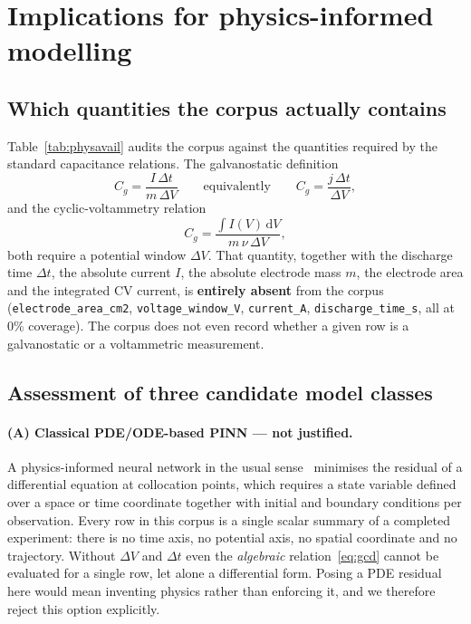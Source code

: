 \section{Implications for physics-informed modelling}\label{sec:pinn}

\subsection{Which quantities the corpus actually contains}
Table~\ref{tab:physavail} audits the corpus against the quantities required by the standard
capacitance relations. The galvanostatic definition
\begin{equation}
C_g = \frac{I\,\Delta t}{m\,\Delta V}
\qquad\text{equivalently}\qquad
C_g = \frac{j\,\Delta t}{\Delta V},
\label{eq:gcd}
\end{equation}
and the cyclic-voltammetry relation
\begin{equation}
C_g = \frac{\int I(V)\,\mathrm{d}V}{m\,\nu\,\Delta V},
\label{eq:cv}
\end{equation}
both require a potential window $\Delta V$. That quantity, together with the discharge time
$\Delta t$, the absolute current $I$, the absolute electrode mass $m$, the electrode area and
the integrated CV current, is \textbf{entirely absent} from the corpus
(\texttt{electrode\_area\_cm2}, \texttt{voltage\_window\_V}, \texttt{current\_A}, \texttt{discharge\_time\_s}, all at
0\% coverage). The corpus does not even record whether a given row is a galvanostatic or a
voltammetric measurement.

\subsection{Assessment of three candidate model classes}
\paragraph{(A) Classical PDE/ODE-based PINN --- not justified.}
A physics-informed neural network in the usual sense~\cite{pinn2019} minimises the residual of
a differential
equation at collocation points, which requires a state variable defined over a space or time
coordinate together with initial and boundary conditions per observation. Every row in this
corpus is a single scalar summary of a completed experiment: there is no time axis, no
potential axis, no spatial coordinate and no trajectory. Without $\Delta V$ and $\Delta t$
even the \emph{algebraic} relation~\eqref{eq:gcd} cannot be evaluated for a single row,
let alone a differential form. Posing a PDE residual here would mean inventing physics rather
than enforcing it, and we therefore reject this option explicitly.

